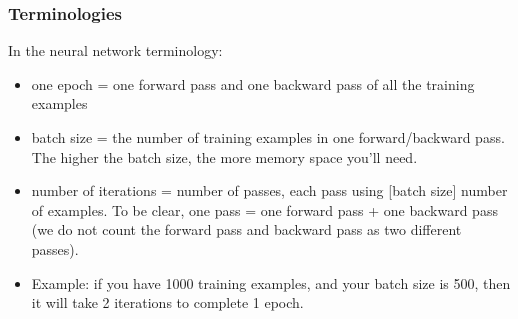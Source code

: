 

\begin{frame}[fragile] \frametitle{Terminologies}

In the neural network terminology:

\begin{itemize}
\item one epoch = one forward pass and one backward pass of all the training examples
\item batch size = the number of training examples in one forward/backward pass. The higher the batch size, the more memory space you'll need.
\item number of iterations = number of passes, each pass using [batch size] number of examples. To be clear, one pass = one forward pass + one backward pass (we do not count the forward pass and backward pass as two different passes).
\item Example: if you have 1000 training examples, and your batch size is 500, then it will take 2 iterations to complete 1 epoch.
\end{itemize}
\end{frame}


